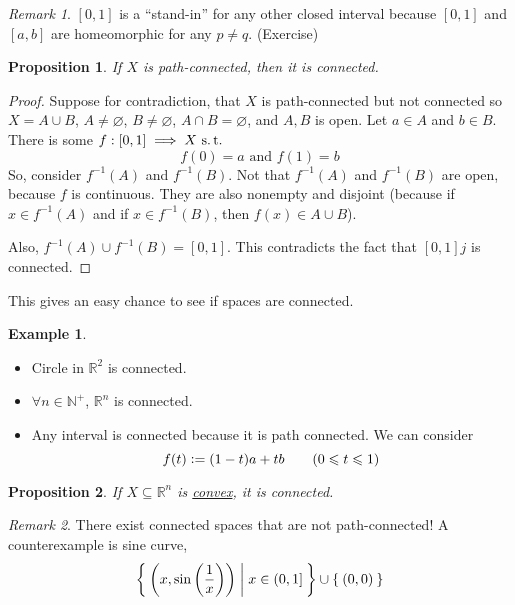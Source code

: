 \documentclass[12pt]{amsart}
\newcommand{\bbR}{\mathbb{R}}
\newcommand{\bbN}{\mathbb{N}}
\newcommand{\suchthat}{\operatorname{\thinspace s.t. \thinspace}}
\theoremstyle{plain}
\newtheorem*{prop}{Proposition}
\theoremstyle{remark}
\newtheorem*{rmk}{Remark}
\theoremstyle{definition}
\newtheorem*{eg}{Example}
\begin{document}
\begin{rmk}
	$[0, 1]$ is a ``stand-in'' for any other closed interval because $[0,1]$ and $[a, b]$ are homeomorphic for any $p \neq q$. (Exercise)
\end{rmk}

\begin{prop}
	If $X$ is path-connected, then it is connected.
\end{prop}

\begin{proof}
	Suppose for contradiction, that $X$ is path-connected but not connected so $X = A \cup B$, $A \neq \varnothing$, $B \neq \varnothing$, $A \cap B = \varnothing$, and $A,B$ is open. Let $a \in A$ and $b \in B$. There is some $f:[0,1] \implies X \suchthat$
	\begin{equation*}
		f(0) = a \text{ and } f(1) = b 
	\end{equation*}
	So, consider $f^{-1}(A)$ and $f^{-1}(B)$. Not that $f^{-1}(A)$ and $f^{-1}(B)$ are open, because $f$ is continuous. They are also nonempty and disjoint (because if $x\in f^{-1}(A)$ and if $x \in f^{-1}(B)$, then $f(x) \in A \cup B$).
	\par
	Also, $f^{-1}(A) \cup f^{-1}(B) = [0, 1]$. This contradicts the fact that $[0,1]j$ is connected.
\end{proof}

This gives an easy chance to see if spaces are connected.

\begin{eg}
	\hfill
	\begin{itemize}
		\item 
			Circle in $\bbR^2$ is connected.
		\item
			$\forall n\in \bbN^{+}$, $\bbR^n$ is connected.
		\item
			Any interval is connected because it is path connected. We can consider
			\begin{equation*}
				f(t) \vcentcolon = (1-t)a + tb \quad\quad(0\leqslant t \leqslant 1)
			\end{equation*}

	\end{itemize}
	
\end{eg}

\begin{prop}
	If $X \subseteq \bbR^n$ is \ul{convex}, it is connected.
\end{prop}

\begin{rmk}
	There exist connected spaces that are not path-connected! A counterexample is sine curve,
	\begin{equation*}
		\Set{\left(x,\sin\left(\frac{1}{x}\right)\right)| x\in (0, 1]} \cup \Set{(0,0)}
	\end{equation*}
\end{rmk}
\end{document}
